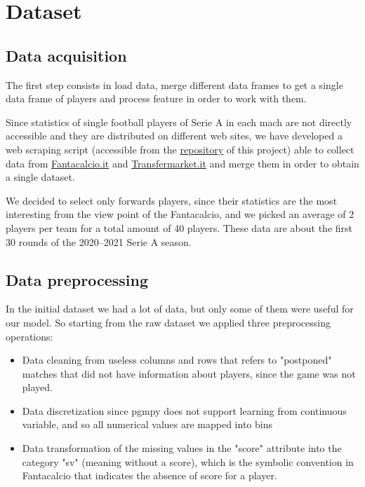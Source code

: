 \documentclass[a4paper,10pt]{report}
\begin{document}


{\let\clearpage\relax\par \chapter{Dataset}\label{chap:chapter-3}} 

\section{Data acquisition}\label{sec:sec-31}
The first step consists in load data, merge different data frames to get a single data frame of players and process feature in order to work with them.

Since statistics of single football players of Serie A in each mach are not directly accessible and they are distributed on different web sites, we have developed a web scraping script (accessible from the \href{https://github.com/giuseppeboezio/FantaBayesianNet/tree/main/src}{repository} of this project) able to collect data from \href{https://www.fantacalcio.it/statistiche-serie-a}{Fantacalcio.it} \cite{fantacalcio} and \href{https://www.transfermarkt.it/serie-a/startseite/wettbewerb/IT1}{Transfermarket.it} \cite{transfermarket} and merge them in order to obtain a single dataset.

We decided to select only forwards players, since their statistics are the most interesting from the view point of the Fantacalcio, and we picked an average of 2 players per team for a total amount of 40 players. 
These data are about the first 30 rounds of the 2020–2021 Serie A season.

\section{Data preprocessing}\label{sec:sec-32}
In the initial dataset we had a lot of data, but only some of them were useful for our model.
So starting from the raw dataset we applied three preprocessing operations:
\begin{itemize}
\item Data cleaning from useless columns and rows that refers to "postponed"  matches that did not have information about players, since the game was not played.
\item Data discretization since pgmpy does not support learning from continuous variable, and so all numerical values are mapped into bins
\item Data transformation of the missing values in the "score" attribute into the category "sv" (meaning without a score), which is the symbolic convention in Fantacalcio that indicates the absence of score for a player.
\end{itemize}
\end{document}
